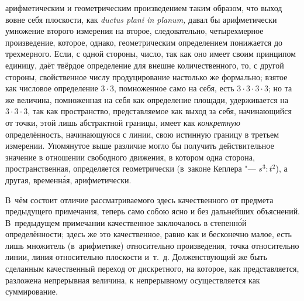 арифметическим и геометрическим произведением таким образом, что выход вовне
себя плоскости, как {\em ductus plani in planum,} давал бы арифметически
умножение второго измерения на второе, следовательно, четырехмерное
произведение, которое, однако, геометрическим определением понижается до
трехмерного. Если, с одной стороны, число, так как оно имеет своим принципом
единицу, даёт твёрдое определение для внешне количественного, то, с другой
стороны, свойственное числу продуцирование настолько же формально; взятое как
числовое определение $3\cdot 3$, помноженное само на себя, есть
$3\cdot 3\cdot 3\cdot 3$; но та же величина, помноженная на себя как определение
площади, удерживается на $3\cdot 3\cdot 3$, так как пространство,
представляемое как выход за себя, начинающийся от точки, этой лишь абстрактной
границы, имеет как {\em конкретную} определённость, начинающуюся с линии, свою
истинную границу в третьем измерении. Упомянутое выше различие могло бы
получить действительное значение в отношении свободного движения, в котором
одна сторона, пространственная, определяется геометрически (в~законе Кеплера
"--- $s^3:t^2$), а другая, временн\'{а}я, арифметически.

В~чём состоит отличие рассматриваемого здесь качественного от предмета
предыдущего примечания, теперь само собою ясно и без дальнейших объяснений.
В~предыдущем примечании качественное заключалось в степенн\'{о}й
определённости; здесь же это качественное, равно как и бесконечно малое, есть
лишь множитель (в~арифметике) относительно произведения, точка относительно
линии, линия относительно плоскости и~т.~д. Долженствующий же быть сделанным
качественный переход от дискретного, на которое, как представляется, разложена
непрерывная величина, к непрерывному осуществляется как суммирование.

